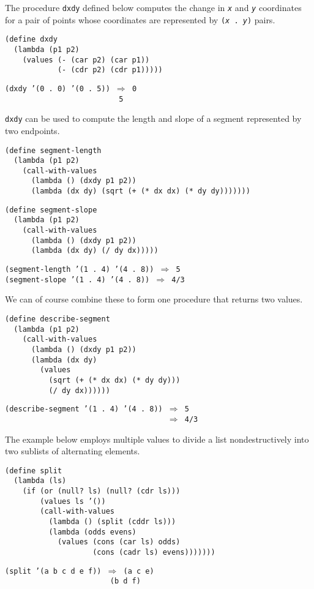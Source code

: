 The procedure \label{control_s72}\texttt{dxdy} defined below computes
the change in \texttt{\textit{x}} and \texttt{\textit{y}} coordinates for a pair of points whose
coordinates are represented by \texttt{(\textit{x} . \textit{y})} pairs.


\begin{alltt}
(define dxdy
  (lambda (p1 p2)
    (values (- (car p2) (car p1))
            (- (cdr p2) (cdr p1)))))

(dxdy '(0 . 0) '(0 . 5)) \(\Rightarrow\) 0
                          5
\end{alltt}

\texttt{dxdy} can be used to compute the length and slope of
a segment represented by two
endpoints.\label{control_s73}\label{control_s74}

\begin{alltt}
(define segment-length
  (lambda (p1 p2)
    (call-with-values
      (lambda () (dxdy p1 p2))
      (lambda (dx dy) (sqrt (+ (* dx dx) (* dy dy)))))))

(define segment-slope
  (lambda (p1 p2)
    (call-with-values
      (lambda () (dxdy p1 p2))
      (lambda (dx dy) (/ dy dx)))))

(segment-length '(1 . 4) '(4 . 8)) \(\Rightarrow\) 5
(segment-slope '(1 . 4) '(4 . 8)) \(\Rightarrow\) 4/3
\end{alltt}


We can of course combine these to form one procedure that returns
two values.\label{control_s75}


\begin{alltt}
(define describe-segment
  (lambda (p1 p2)
    (call-with-values
      (lambda () (dxdy p1 p2))
      (lambda (dx dy)
        (values
          (sqrt (+ (* dx dx) (* dy dy)))
          (/ dy dx))))))

(describe-segment '(1 . 4) '(4 . 8)) \(\Rightarrow\) 5
                                     \(\Rightarrow\) 4/3
\end{alltt}


The example below employs multiple values to divide a
list nondestructively into two sublists of alternating
elements.


\begin{alltt}
(define split
  (lambda (ls)
    (if (or (null? ls) (null? (cdr ls)))
        (values ls '())
        (call-with-values
          (lambda () (split (cddr ls)))
          (lambda (odds evens)
            (values (cons (car ls) odds)
                    (cons (cadr ls) evens)))))))

(split '(a b c d e f)) \(\Rightarrow\) (a c e)
                        (b d f)
\end{alltt}



